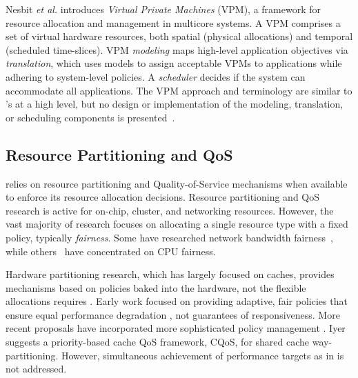 Nesbit \emph{et al.}\cite{1436097} introduces \emph{Virtual Private Machines} (VPM), a framework for resource allocation and management in multicore systems. A VPM comprises a set of virtual hardware resources, both spatial (physical allocations) and temporal (scheduled time-slices).
VPM \emph{modeling} maps high-level application objectives via
\emph{translation}, which uses models to assign acceptable VPMs to
applications while adhering to system-level policies. A
\emph{scheduler} decides if the system can accommodate all
applications. The VPM approach and terminology are similar to
\pacora's at a high level, but no design or implementation of the
modeling, translation, or scheduling components is presented~\cite{1436097}.
%

\subsection{Resource Partitioning and QoS}
\label{sec:rel:pm}

\pacora relies on resource partitioning and Quality-of-Service mechanisms when available to enforce its resource allocation decisions.  Resource partitioning and QoS research is active for on-chip, cluster, and networking resources.  However, the vast majority of research focuses on allocating a single resource type with a fixed policy, typically \emph{fairness}.
Some have researched network bandwidth fairness~\cite{Blanquer, Kleinberg99fairnessin, Liu}, while others~\cite{Baruah96proportionateprogress, Baruah_fastscheduling, Zhu} have concentrated on CPU fairness.

Hardware partitioning research, which has largely focused on caches, provides mechanisms based on policies baked into the hardware, not the flexible allocations \pacora requires \cite{876484, 967444,1194855,1275005,1194858,1318096,1088154,1399973,1069998,1399982}.  Early work focused on providing adaptive, fair policies that ensure equal performance degradation \cite{605420,1086328}, not guarantees of responsiveness. More recent proposals have incorporated more sophisticated policy management \cite{1241608,1331730,1152161,1254886}. Iyer\cite{1006246} suggests a priority-based cache QoS framework, CQoS, for shared cache way-partitioning.
However, simultaneous achievement of performance targets as in \pacora is not addressed.



